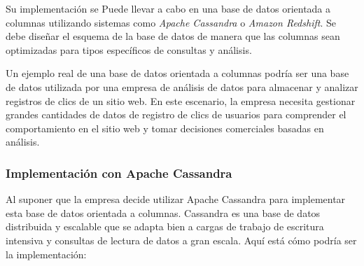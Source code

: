 Su implementación se Puede llevar a cabo en  una base de datos orientada a columnas utilizando sistemas como \textit{Apache Cassandra} o \textit{Amazon Redshift}. Se debe diseñar el esquema de la base de datos de manera que las columnas sean optimizadas para tipos específicos de consultas y análisis.

Un ejemplo real de una base de datos orientada a columnas podría ser una base de datos utilizada por una empresa de análisis de datos para almacenar y analizar registros de clics de un sitio web. En este escenario, la empresa necesita gestionar grandes cantidades de datos de registro de clics de usuarios para comprender el comportamiento en el sitio web y tomar decisiones comerciales basadas en análisis.

\subsubsection{Implementación con Apache Cassandra}
\noindent
Al suponer que la empresa decide utilizar Apache Cassandra para implementar esta base de datos orientada a columnas. Cassandra es una base de datos distribuida y escalable que se adapta bien a cargas de trabajo de escritura intensiva y consultas de lectura de datos a gran escala. Aquí está cómo podría ser la implementación:

